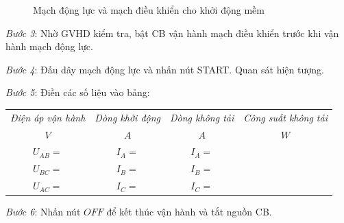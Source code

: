 \documentclass[13pt,a4paper]{extarticle}
\begin{document}
\begin{list}{--}{}
\begin{figure}[!h]
\begin{center}
\end{center}
\caption{Mạch động lực và mạch điều khiển cho khởi động mềm}\label{Fig:5}
\end{figure}
\item \textit{Bước 3}: Nhờ GVHD kiểm tra, bật CB vận hành mạch điều khiển trước khi vận hành mạch động lực. 
\item \textit{Bước 4}: Đấu dây mạch động lực và nhấn nút START. Quan sát hiện tượng.
\item \textit{Bước 5}: Điền các số liệu vào bảng:
\begin{center}
\begin{tabular}{|c|c|c|c|}\hline
\textit{Điện áp vận hành} & \textit{Dòng khởi động} & \textit{Dòng không tải} & \textit{Công suất không tải}\\ 
$V$ & $A$ & $A$ & $W$ \\ \hline
$U_{AB}= $&$I_A = $ & $I_A = $ & \\ \hline
$U_{BC}= $&$I_B = $ & $I_B = $ & \\ \hline
$U_{AC}= $&$I_C = $ & $I_C = $ & \\ \hline
\end{tabular}
\end{center}
\item \textit{Bước 6}: Nhấn nút $OFF$ để kết thúc vận hành và tắt nguồn CB.
\end{list}
\end{document}
